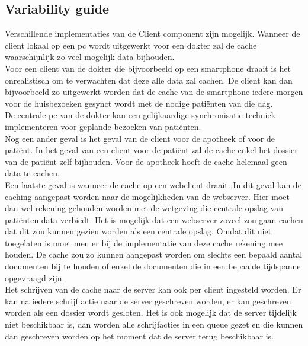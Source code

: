 \documentclass[a4paper,10pt]{article}
\begin{document}
\subsection{Variability guide}
Verschillende implementaties van de Client component zijn mogelijk.  Wanneer de client lokaal op een pc wordt uitgewerkt voor een dokter zal de cache waarschijnlijk zo veel mogelijk data bijhouden.\\
Voor een client van de dokter die bijvoorbeeld op een smartphone draait is het onrealistisch om te verwachten dat deze alle data zal cachen.  De client kan dan bijvoorbeeld zo uitgewerkt worden dat de cache van de smartphone iedere morgen voor de huisbezoeken gesynct wordt met de nodige pati\"{e}nten van die dag.\\
De centrale pc van de dokter kan een gelijkaardige synchronisatie techniek implementeren voor geplande bezoeken van pati\"{e}nten.\\
Nog een ander geval is het geval van de client voor de apotheek of voor de pati\"{e}nt.  In het geval van een client voor de pati\"{e}nt zal de cache enkel het dossier van de pati\"{e}nt zelf bijhouden.  Voor de apotheek hoeft de cache helemaal geen data te cachen.\\
Een laatste geval is wanneer de cache op een webclient draait.  In dit geval kan de caching aangepast worden naar de mogelijkheden van de webserver.  Hier moet dan wel rekening gehouden worden met de wetgeving die centrale opslag van pati\"{e}nten data verbiedt.  Het is mogelijk dat een webserver zoveel zou gaan cachen dat dit zou kunnen gezien worden als een centrale opslag.  Omdat dit niet toegelaten is moet men er bij de implementatie van deze cache rekening mee houden.  De cache zou zo kunnen aangepast worden om slechts een bepaald aantal documenten bij te houden of enkel de documenten die in een bepaalde tijdspanne opgevraagd zijn.\\
Het schrijven van de cache naar de server kan ook per client ingesteld worden.  Er kan na iedere schrijf actie naar de server geschreven worden, er kan geschreven worden als een dossier wordt gesloten.  Het is ook mogelijk dat de server tijdelijk niet beschikbaar is, dan worden alle schrijfacties in een queue gezet en die kunnen dan geschreven worden op het moment dat de server terug beschikbaar is.
\end{document}
